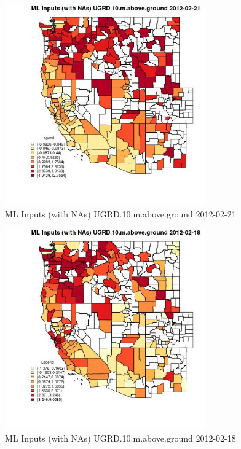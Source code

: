\begin{figure} 
\centering  
\includegraphics[width=0.77\textwidth]{Code_Outputs/Report_ML_input_PM25_Step4_part_f_de_duplicated_aveswNAs_CountyUGRD10mabovegroundMean2012-02-21.jpg} 
\caption{\label{fig:Report_ML_input_PM25_Step4_part_f_de_duplicated_aveswNAsCountyUGRD10mabovegroundMean2012-02-21}ML Inputs (with NAs) UGRD.10.m.above.ground 2012-02-21} 
\end{figure} 
 

\begin{figure} 
\centering  
\includegraphics[width=0.77\textwidth]{Code_Outputs/Report_ML_input_PM25_Step4_part_f_de_duplicated_aveswNAs_CountyUGRD10mabovegroundMean2012-02-18.jpg} 
\caption{\label{fig:Report_ML_input_PM25_Step4_part_f_de_duplicated_aveswNAsCountyUGRD10mabovegroundMean2012-02-18}ML Inputs (with NAs) UGRD.10.m.above.ground 2012-02-18} 
\end{figure} 
 

